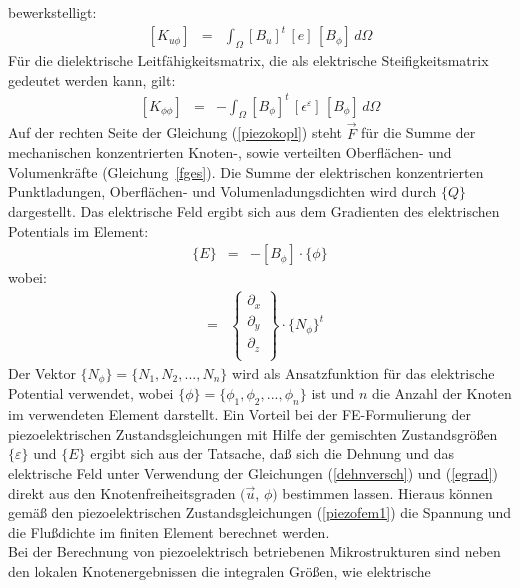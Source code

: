 bewerkstelligt:
\begin{eqnarray}
\label{piezomatrix}
 [K_{u \phi}] & = & \int_{\Omega} [B_{u}]^{t} \, [e] \, [B_{\phi}] \, d\Omega
\end{eqnarray}
Für die dielektrische Leitfähigkeitsmatrix, die als \glqq elektrische
Steifigkeitsmatrix\grqq \, gedeutet werden kann, gilt:
\begin{eqnarray}
\label{dielekmatrix}
 [K_{\phi \phi}] & = & -\int_{\Omega}
     [B_{\phi}]^{t} \, [\epsilon^{\varepsilon}] \, [B_{\phi}] \, d\Omega
\end{eqnarray}
Auf der rechten Seite der Gleichung (\ref{piezokopl}) steht $\vec F$ für
die Summe der mechanischen konzentrierten Knoten-, sowie verteilten
Oberflächen- und
Volumenkräfte (Gleichung~\ref{fges}). Die Summe der elektrischen
konzentrierten Punktladungen, Oberflächen- und Volumenladungsdichten wird
durch $\{Q\}$ dargestellt. Das elektrische Feld ergibt sich aus
dem Gradienten des elektrischen Potentials im Element:
\begin{eqnarray}
\label{egrad}
 \{E\} & = & - [ B_{\phi} ] \cdot \{ \phi \}
\end{eqnarray}
wobei:
\begin{eqnarray}
 [B_{\phi}] & = &
 \left \{
  \begin{array}{c}
    \partial_{x} \\ \partial_{y} \\ \partial_{z} \\
   \end{array}
  \right \} \cdot  \{ N_{\phi} \}^{t}
\end{eqnarray}
Der Vektor $\{N_{\phi}\} = \{N_{1}, N_{2},..., N_{n}\}$ wird als
Ansatzfunktion für das elektrische Potential verwendet, wobei
$\{\phi\} = \{\phi_{1}, \phi_{2},..., \phi_{n}\}$ ist und $n$ die Anzahl
der Knoten im verwendeten Element darstellt. Ein Vorteil bei der
FE-Formulierung der piezoelektrischen Zustandsgleichungen mit Hilfe der
gemischten Zustandsgrößen $\{\varepsilon\}$ und $\{E\}$ ergibt sich aus der
Tatsache, daß sich die Dehnung und das elektrische Feld unter Verwendung
der Gleichungen (\ref{dehnversch}) und (\ref{egrad}) direkt aus den
Knotenfreiheitsgraden $(\vec u$, $\phi)$ bestimmen lassen. Hieraus können
gemäß den piezoelektrischen Zustandsgleichungen (\ref{piezofem1}) die
Spannung und die Flußdichte im finiten Element berechnet werden. \\
Bei der Berechnung von piezoelektrisch betriebenen Mikrostrukturen sind neben
den lokalen Knotenergebnissen die integralen Größen, wie elektrische
